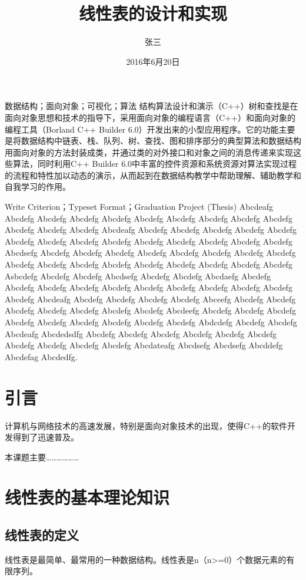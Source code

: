 \documentclass[supercite]{upcthesis}
\title{线性表的设计和实现}
\author{张三}
\date{2016年6月20日}
\begin{document}
	\maketitle
	\begin{cnabstract}{数据结构；面向对象；可视化；算法}
		结构算法设计和演示（C++）树和查找是在面向对象思想和技术的指导下，采用面向对象的编程语言（C++）和面向对象的编程工具（Borland C++ Builder 6.0）开发出来的小型应用程序。它的功能主要是将数据结构中链表、栈、队列、树、查找、图和排序部分的典型算法和数据结构用面向对象的方法封装成类，并通过类的对外接口和对象之间的消息传递来实现这些算法，同时利用C++ Builder 6.0中丰富的控件资源和系统资源对算法实现过程的流程和特性加以动态的演示，从而起到在数据结构教学中帮助理解、辅助教学和自我学习的作用。
	\end{cnabstract}
    
	\begin{enabstract}{Write Criterion；Typeset Format；Graduation Project (Thesis)}
	Abcdeafg Abcdefg Abcdefg Abcdefg Abcdefg Abcdefg Abcdefg Abcdefg Abcdefg Abcdefg Abcdefg Abcdefg Abcdefg Abcdeafg Abcdefg Abcdefg Abcdefg Abcdefg Abcdefg Abcdefg Abcdefg Abcdefg Abcdefg Abcdefg Abcdefg Abcdefg Abcdefg Abcdefg Abcdsefg Abcdefg Abcdefg Abcdefg Abcdefg Abcdefg Abcdefg Abcdefg Abcdefg Abcdefg Abcdefg Abcdefg Abcdefg Abcdefg Abcdefg Abcdefg Abcdefg Abcdefg Asbcdefg Abcdefg Abcdefg Abcdsefg Abcdefg Abcdefg Abcdaefg Abcdefg Abcdefg Abcdefg Abcdefg Abcdefg Abcdefg Abcdefg Abcdefg Abcdefg Abcdefg Abcdefg Abcdeafg Abcdefg Abcdefg Abcdefg Abcdefg Abceefg Abcdefg Abcdefg Abcdefg Abcdefg Abcdefg Abcdefg Abcdefg Abcdeefg Abcdefg Abcdefg Abcdefg Abcdefg Abcdefg Abcdefg Abcdefg Abcdefg Abcdefg Abdcdefg Abcdefg Abcdefg Abcdeafg Abcdedsdfg Abcdefg Abcdefg Abcdefg Abcdefg Abcdefg Abcdefg Abcdefg Abcdefg Abcdefg Abcdefg Abcdateafg Abcdsefg Abcdsefg Abcddefg Abcdefag Abcdedfg.
	\end{enabstract}

\tableofcontents

\section{引言}
计算机与网络技术的高速发展，特别是面向对象技术的出现，使得C++的软件开发得到了迅速普及。

本课题主要………………
\section{线性表的基本理论知识}
\subsection{线性表的定义}
线性表是最简单、最常用\cite{Rouse1974Monitoring}的一种数据结构。线性表\cite{贾永红2010数字图像处理}是n（n>=0）个数据元素的有限序列。
\end{document}
